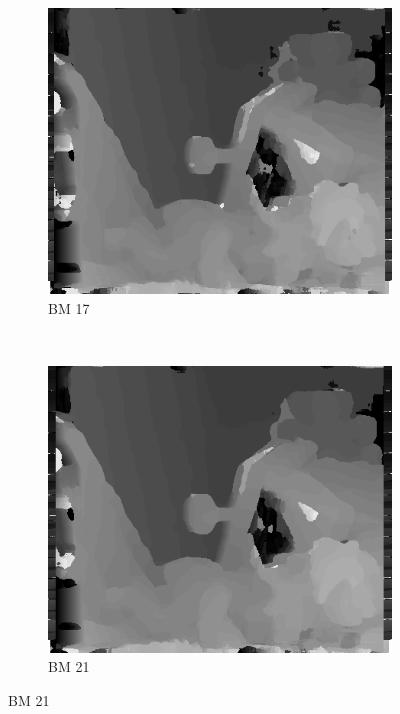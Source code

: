 \begin{figure}
  ~
  \begin{subfigure}[b]{0.23\textwidth}
    \centering
    \includegraphics[width=\textwidth]{images/stereo-pairs/teddy_bm_17.png}
    \caption{BM 17}
  \end{subfigure}
  ~
  \begin{subfigure}[b]{0.23\textwidth}
    \centering
    \includegraphics[width=\textwidth]{images/stereo-pairs/teddy_bm_21.png}
    \caption{BM 21}
  \end{subfigure}





\end{figure}
